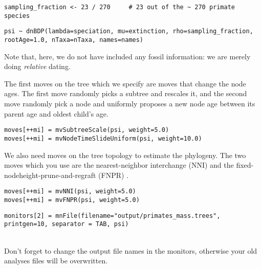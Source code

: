 {\tt \small \begin{snugshade*}
\begin{lstlisting}
sampling_fraction <- 23 / 270     # 23 out of the ~ 270 primate species
\end{lstlisting}
\end{snugshade*}}

{\tt \small \begin{snugshade*}
\begin{lstlisting}
psi ~ dnBDP(lambda=speciation, mu=extinction, rho=sampling_fraction, rootAge=1.0, nTaxa=nTaxa, names=names)
\end{lstlisting}
\end{snugshade*}}
Note that, here, we do not have included any fossil information: we are merely doing \emph{relative} dating. 

The first moves on the tree which we specify are moves that change the node ages. The first move randomly picks a subtree and rescales it, and the second move randomly pick a node and uniformly proposes a new node age between its parent age and oldest child's age.
{\tt \small \begin{snugshade*}
\begin{lstlisting}
moves[++mi] = mvSubtreeScale(psi, weight=5.0)
moves[++mi] = mvNodeTimeSlideUniform(psi, weight=10.0)
\end{lstlisting}
\end{snugshade*}}

We also need moves on the tree topology to estimate the phylogeny. The two moves which you use are the nearest-neighbor interchange (NNI) and the fixed-nodeheight-prune-and-regraft (FNPR) \citep{Hohna2012}.
{\tt \small \begin{snugshade*}
\begin{lstlisting}
moves[++mi] = mvNNI(psi, weight=5.0)
moves[++mi] = mvFNPR(psi, weight=5.0)\end{lstlisting}
\end{snugshade*}}

{\tt \small \begin{snugshade*}
\begin{lstlisting}
monitors[2] = mnFile(filename="output/primates_mass.trees", printgen=10, separator = TAB, psi)
\end{lstlisting}
\end{snugshade*}}

\noindent \\ \impmark Don't forget to change the output file names in the monitors, otherwise your old analyses files will be overwritten.


